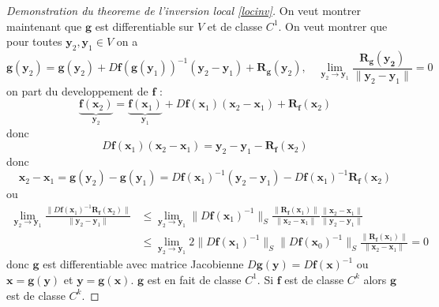 \begin{proof}[Demonstration du theoreme de l'inversion local \ref{locinv}]
On veut montrer maintenant que $\boldsymbol{g}$ est differentiable sur $V$ et de classe $C^{1}$. On veut montrer que pour toutes $\boldsymbol{y}_{2},\boldsymbol{y}_{1}\in V$ on a
$$
\boldsymbol{g}(\boldsymbol{y}_{2})=\boldsymbol{g}(\boldsymbol{y}_{2})+D\boldsymbol{f}(\boldsymbol{g}(\boldsymbol{y}_{1}))^{-1}(\boldsymbol{y}_{2}-\boldsymbol{y}_{1})+\boldsymbol{R}_{\boldsymbol{g}}(\boldsymbol{y}_{2}),\quad \lim_{ \boldsymbol{y}_{2} \to \boldsymbol{y}_{1} }  \frac{\boldsymbol{R}_{\boldsymbol{g}}(\boldsymbol{y_{2}})}{\lVert \boldsymbol{y}_{2}-\boldsymbol{y}_{1} \rVert }=0
$$
on part du developpement de $\boldsymbol{f}$ :
$$
\underbrace{ \boldsymbol{f}(\boldsymbol{x}_{2}) }_{ \boldsymbol{y}_{2} }=\underbrace{ \boldsymbol{f}(\boldsymbol{x}_{1}) }_{ \boldsymbol{y}_{1} }+D\boldsymbol{f}(\boldsymbol{x}_{1})(\boldsymbol{x}_{2}-\boldsymbol{x}_{1})+\boldsymbol{R}_{\boldsymbol{f}}(\boldsymbol{x}_{2})
$$
donc 
$$
D\boldsymbol{f}(\boldsymbol{x}_{1})(\boldsymbol{x}_{2}-\boldsymbol{x}_{1})=\boldsymbol{y}_{2}-\boldsymbol{y}_{1}-\boldsymbol{R}_{\boldsymbol{f}}(\boldsymbol{x}_{2})
$$
donc
$$
\boldsymbol{x}_{2}-\boldsymbol{x}_{1}=\boldsymbol{g}(\boldsymbol{y}_{2})-\boldsymbol{g}(\boldsymbol{y}_{1})=D\boldsymbol{f}(\boldsymbol{x}_{1})^{-1}(\boldsymbol{y}_{2}-\boldsymbol{y}_{1})-D\boldsymbol{f}(\boldsymbol{x}_{1})^{-1}\boldsymbol{R}_{\boldsymbol{f}}(\boldsymbol{x}_{2})
$$
ou
\begin{align*}
\lim_{ \boldsymbol{y}_{2} \to \boldsymbol{y}_{1} } \frac{\lVert D\boldsymbol{f}(\boldsymbol{x}_{1})^{-1}\boldsymbol{R}_{\boldsymbol{f}}(\boldsymbol{x}_{2}) \rVert }{\lVert \boldsymbol{y}_{2}-\boldsymbol{y}_{1}\rVert} & \le \lim_{ \boldsymbol{y}_{2} \to \boldsymbol{y}_{1} } \lVert D\boldsymbol{f}(\boldsymbol{x}_{1})^{-1} \rVert_{S}  \frac{\lVert \boldsymbol{R}_{\boldsymbol{f}}(\boldsymbol{x}_{1})\rVert}{\lVert \boldsymbol{x}_{2}-\boldsymbol{x}_{1} \rVert } \frac{\lVert \boldsymbol{x}_{2}-\boldsymbol{x}_{1} \rVert }{\lVert \boldsymbol{y}_{2}-\boldsymbol{y}_{1} \rVert } \\
 &  \le \lim_{ \boldsymbol{y}_{2} \to \boldsymbol{y}_{1} } 2\lVert D\boldsymbol{f}(\boldsymbol{x}_{1})^{-1} \rVert_{S} \lVert D\boldsymbol{f}(\boldsymbol{x}_{0})^{-1} \rVert_{S}  \frac{\lVert \boldsymbol{R}_{\boldsymbol{f}}(\boldsymbol{x}_{1}) \rVert }{\lVert \boldsymbol{x}_{2}-\boldsymbol{x}_{1} \rVert }=0
\end{align*}
donc $\boldsymbol{g}$ est differentiable avec matrice Jacobienne $D\boldsymbol{g}(\boldsymbol{y})=D\boldsymbol{f}(\boldsymbol{x})^{-1}$ ou $\boldsymbol{x}=\boldsymbol{g}(\boldsymbol{y})$ et $\boldsymbol{y}=\boldsymbol{g}(\boldsymbol{x})$. $\boldsymbol{g}$ est en fait de classe $C^{1}$. Si $\boldsymbol{f}$ est de classe $C^{k}$ alors $\boldsymbol{g}$ est de classe $C^{k}$.
\end{proof}


